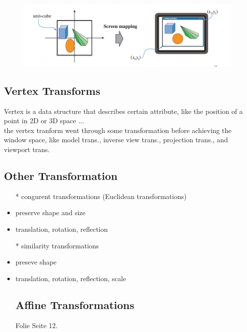 \documentclass[12pt, a4paper]{article}
\begin{document}
\begin{figure}[!ht]
  \centering
  \includegraphics[width=\textwidth]{image/viewportTransform}
  \label{}
\end{figure}

\subsection{Vertex Transforms}
Vertex is a data structure that describes certain attribute, like the position of a point in 2D or 3D space ... \\
the vertex tranform went through some transformation before achieving the window space, like model trans., inverse view trans., projection trans., and viewport trans.

\subsection{Other Transformation}
\begin{itemize}
  \item[*] congurent transformations (Euclidean transformations)
  \item preserve shape and size
  \item translation, rotation, reflection
  \item[*] similarity transformations
  \item preseve shape
  \item translation, rotation, reflection, scale

\subsection{Affine Transformations}
Folie Seite 12.

\end{itemize}
\end{document}
